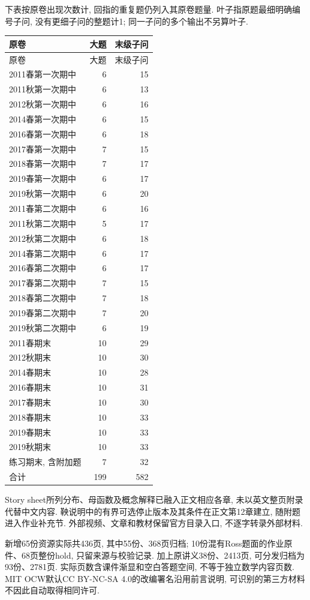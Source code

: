 下表按原卷出现次数计, 回指的重复题仍列入其原卷题量. 叶子指原题最细明确编号子问, 没有更细子问的整题计1; 同一子问的多个输出不另算叶子.
\begin{longtable}{@{}p{.48\linewidth}rr@{}}
\toprule 原卷 & 大题 & 末级子问\\\midrule
\endfirsthead
\toprule 原卷 & 大题 & 末级子问\\\midrule
\endhead
2011春第一次期中 & 6 & 15\\
2011秋第一次期中 & 6 & 13\\
2012秋第一次期中 & 6 & 16\\
2014春第一次期中 & 6 & 15\\
2016春第一次期中 & 6 & 18\\
2017春第一次期中 & 7 & 15\\
2018春第一次期中 & 7 & 17\\
2019春第一次期中 & 6 & 17\\
2019秋第一次期中 & 6 & 20\\\midrule
2011春第二次期中 & 6 & 16\\
2011秋第二次期中 & 5 & 17\\
2012秋第二次期中 & 6 & 18\\
2014春第二次期中 & 6 & 17\\
2016春第二次期中 & 6 & 17\\
2017春第二次期中 & 7 & 15\\
2018春第二次期中 & 7 & 18\\
2019春第二次期中 & 7 & 20\\
2019秋第二次期中 & 6 & 19\\\midrule
2011春期末 & 10 & 29\\
2012秋期末 & 10 & 30\\
2014春期末 & 10 & 28\\
2016春期末 & 10 & 31\\
2017春期末 & 10 & 30\\
2018春期末 & 10 & 33\\
2019春期末 & 10 & 33\\
2019秋期末 & 10 & 33\\
练习期末, 含附加题 & 7 & 32\\\midrule
合计 & 199 & 582\\
\bottomrule
\end{longtable}

Story sheet所列分布、母函数及概念解释已融入正文相应各章, 未以英文整页附录代替中文内容. 鞅说明中的有界可选停止版本及其条件在正文第12章建立, 随附题进入作业补充节. 外部视频、文章和教材保留官方目录入口, 不逐字转录外部材料.

新增65份资源实际共436页, 其中55份、368页归档; 10份混有Ross题面的作业原件、68页整份hold, 只留来源与校验记录. 加上原讲义38份、2413页, 可分发归档为93份、2781页. 实际页数含课件渐显和空白答题空间, 不等于独立数学内容页数. MIT OCW默认CC BY-NC-SA 4.0的改编署名沿用前言说明, 可识别的第三方材料不因此自动取得相同许可.
